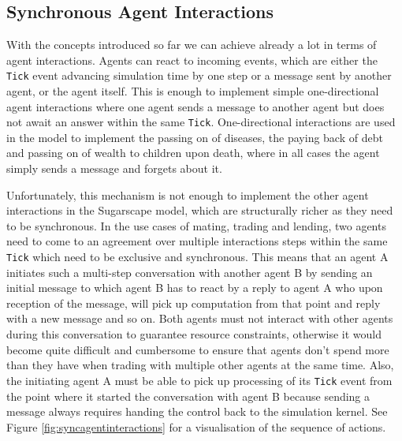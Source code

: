 \subsection{Synchronous Agent Interactions}
With the concepts introduced so far we can achieve already a lot in terms of agent interactions. Agents can react to incoming events, which are either the \texttt{Tick} event advancing simulation time by one step or a message sent by another agent, or the agent itself. This is enough to implement simple one-directional agent interactions where one agent sends a message to another agent but does not await an answer within the same \texttt{Tick}. One-directional interactions are used in the model to implement the passing on of diseases, the paying back of debt and passing on of wealth to children upon death, where in all cases the agent simply sends a message and forgets about it.

Unfortunately, this mechanism is not enough to implement the other agent interactions in the Sugarscape model, which are structurally richer as they need to be synchronous. In the use cases of mating, trading and lending, two agents need to come to an agreement over multiple interactions steps within the same \texttt{Tick} which need to be exclusive and synchronous. This means that an agent A initiates such a multi-step conversation with another agent B by sending an initial message to which agent B has to react by a reply to agent A who upon reception of the message, will pick up computation from that point and reply with a new message and so on. Both agents must not interact with other agents during this conversation to guarantee resource constraints, otherwise it would become quite difficult and cumbersome to ensure that agents don't spend more than they have when trading with multiple other agents at the same time. Also, the initiating agent A must be able to pick up processing of its \texttt{Tick} event from the point where it started the conversation with agent B because sending a message always requires handing the control back to the simulation kernel. See Figure \ref{fig:syncagentinteractions} for a visualisation of the sequence of actions.

